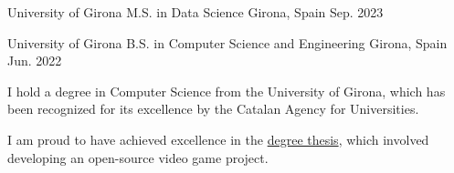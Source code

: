 

\begin{cventries}

  \cventry
    {University of Girona} %
    {M.S. in Data Science} %
    {Girona, Spain} %
    {Sep. 2023} %
    {
      \begin{cvitems} %
      \end{cvitems}
    }

    \cventry
    {University of Girona} %
    {B.S. in Computer Science and Engineering} %
    {Girona, Spain} %
    {Jun. 2022} %
    {
      \begin{cvitems} %
        \item {I hold a degree in Computer Science from the University of Girona,
          which has been recognized for its excellence by the Catalan Agency for Universities.}
        \item {I am proud to have achieved excellence in the
          \href{https://github.com/2WolfGames/Erlang-Legacy}{\color{awesome-red}degree thesis},
         which involved developing an open-source video game project.
}
      \end{cvitems}
    }

\end{cventries}
